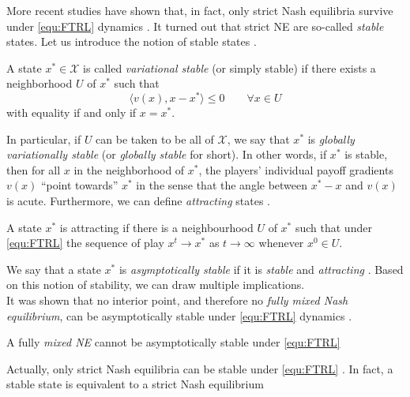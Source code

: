 More recent studies have shown that, in fact, only strict Nash equilibria survive under \ref{equ:FTRL} dynamics \cite{flokas}. It turned out that strict NE are so-called \textit{stable} states. Let us introduce the notion of stable states \cite[Def. 4.2]{HDRmertikopoulos}. 

\begin{definition}\label{def:stability}
    A state $x^* \in \mathcal{X}$ is called \textit{variational stable} (or simply stable) if there exists a neighborhood $U$ of $x^*$ such that 
    \[\langle v(x),x-x^*\rangle \le 0 \qquad \forall x \in U\]
    with equality if and only if $x = x^*$.
\end{definition}

In particular, if $U$ can be taken to be all of $\mathcal{X}$, we say that $x^*$ is \textit{globally variationally stable} (or \textit{globally stable} for short). In other words, if $x^*$ is stable, then for all $x$ in the neighborhood of $x^*$, the players’ individual payoff gradients $v(x)$ “point towards” $x^*$ in the sense that the angle between $x^* - x$ and $v(x)$ is acute. Furthermore, we can define \textit{attracting} states \cite[Def. 3.2.3]{HDRmertikopoulos}. 

\begin{definition}\label{def:attracting}
    A state $x^*$ is attracting if there is a neighbourhood $U$ of $x^*$ such that under \ref{equ:FTRL} the sequence of play $x^t \to x^*$ as $t \to \infty$ whenever $x^0 \in U$. 
\end{definition}

We say that a state $x^*$ is \textit{asymptotically stable} if it is \textit{stable} and \textit{attracting} \cite[Def. 3.2.4]{HDRmertikopoulos}. Based on this notion of stability, we can draw multiple implications. \\

It was shown that no interior point, and therefore no \textit{fully mixed Nash equilibrium}, can be asymptotically stable under \ref{equ:FTRL} dynamics \cite[Theorem 1]{flokas}.  

\begin{proposition}\label{prop:noInteriorStable}
    A fully \textit{mixed NE} cannot be asymptotically stable under \ref{equ:FTRL}
\end{proposition}

Actually, only strict Nash equilibria can be stable under \ref{equ:FTRL} \cite[Theorem 2]{flokas}. In fact, a stable state is equivalent to a strict Nash equilibrium \cite[Prop. 5.2]{mertikopoulos}

